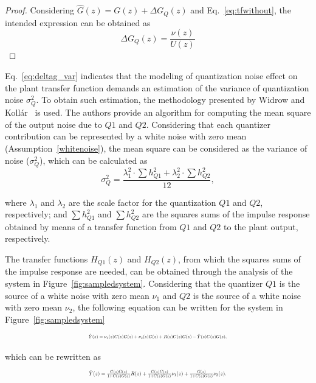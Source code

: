 \documentclass{sig-alternate-05-2015}
\begin{document}
\begin{proof}
Considering $\hat{G}(z)=G(z)+\Delta{G_{Q}(z)}$ and Eq.~\eqref{eq:tfwithout}, the intended expression can be obtained as
%
\begin{equation}
\Delta{G_{Q}(z)}=\frac{\nu(z)}{U(z)} 
\end{equation}
\end{proof}

Eq.~\eqref{eq:deltag_var} indicates that the modeling of quantization noise effect on the plant transfer function demands an estimation of the variance of quantization noise $\sigma_{Q}^{2}$. To obtain such estimation, the methodology presented by Widrow and Koll\'ar~\cite{widrow2008quantization} is used. The authors provide an algorithm for computing the mean square of the output noise due to $Q1$ and $Q2$. Considering that each quantizer contribution can be represented by a white noise with zero mean (Assumption~\ref{whitenoise}), the mean square can be considered as the variance of noise ($\sigma_{Q}^{2}$), which can be calculated as
%
\begin{equation}
\sigma_{Q}^{2}=\frac{\lambda_{1}^{2}\cdot \sum {h_{Q1}^{2}}+\lambda_{2}^{2}\cdot \sum {h_{Q2}^{2}}}{12},
\end{equation}

\noindent where $\lambda_{1}$ and $\lambda_{2}$ are the scale factor for the quantization $Q1$ and $Q2$, respectively; and $\sum {h_{Q1}^{2}}$ and $\sum {h_{Q2}^{2}}$ are the squares sums of the impulse response obtained by means of a transfer function from $Q1$ and $Q2$ to the plant output, respectively.

The transfer functions $H_{Q1}(z)$ and $H_{Q2}(z)$, from which the squares sums of the impulse response are needed, can be obtained through the analysis of the system in Figure~\ref{fig:sampledsystem}. Considering that the quantizer $Q1$ is the source of a white noise with zero mean $\nu_{1}$ and $Q2$ is the source of a white noise with zero mean $\nu_{2}$, the following equation can be written for the system in Figure~\ref{fig:sampledsystem}
%
\begin{equation}
\resizebox{0.48\textwidth}{!}{
$\hat{Y}(z)=\nu_{1}(z)C(z)G(z)+\nu_{2}(z)G(z)+R(z)C(z)G(z)-\hat{Y}(z)C(z)G(z),$
}
\end{equation}

\noindent which can be rewritten as
%
\begin{equation}
\label{eq:outputfunctions}
\resizebox{0.48\textwidth}{!}{
$\hat{Y}(z)=\frac{C(z)G(z)}{1+C(z)G(z)}R(z)+\frac{C(z)G(z)}{1+C(z)G(z)}\nu_{1}(z) \\
+\frac{G(z)}{1+C(z)G(z)}\nu_{2}(z).$
}
\end{equation}
\end{document}

